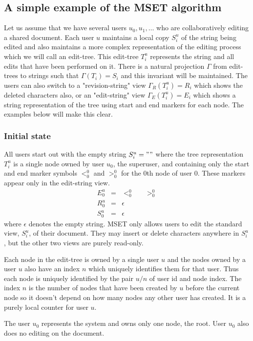 \documentclass{amsart}
\begin{document}
\subsection{A simple example of the MSET algorithm}
Let us assume that we have several users $u_0,u_1,\ldots$ who are
collaboratively editing a shared document. Each user $u$ maintains a local
copy $S^u_i$ of the string being edited and also maintains a more complex representation of the editing process
which we will call an edit-tree.
This edit-tree $T^u_i$ represents the string and all edits that have been
performed on it. There is a natural projection $\Gamma$ from edit-trees to
strings such that $\Gamma(T_i)=S_i$ and this invariant will be maintained.
The users can also switch to a "revision-string" view $\Gamma_R(T^u_i)=R_i$ which
shows the deleted characters also, or an "edit-string" view $\Gamma_E(T^u_i)=E_i$
which shows a string representation of the tree using start and end markers for each node.  The examples below will
make this clear.

\subsubsection{Initial state}
All users start out with the empty string $S^u_i=""$ where the
tree representation $T^u_i$ is a single node owned by user $u_0$, the superuser,
and containing only the start and end marker symbols $<^0_0$ and $>^0_0$ for the 0th node of user 0. These markers appear only in 
 the edit-string view.
\begin{align*}
E^u_0 &=& <_0^0 \;\;\;\;\;\; >_0^0 \\
R^u_0 &=& \epsilon\\
S^u_0 &=& \epsilon
\end{align*}
where $\epsilon$ denotes the empty string.
MSET only allows users to edit the standard view, $S^u_i$, of their document. They may insert or delete characters anywhere in $S^u_i$, but the other two views are purely read-only.

Each node in the edit-tree is owned by
a single user $u$ and the nodes owned by a user $u$ also have an index $n$
which uniquely identifies them for that user. 
Thus each node
is uniquely identified by the pair $u/n$ of user id and node index.
The index $n$ is the number of nodes that have been created by $u$ before
the current node so it doesn't depend on how many nodes any other user
has created. It is a purely local counter for user $u$.

The user $u_0$ represents the
system and owns only one node, the root. User $u_0$ also does no editing on
the document.
\end{document}
